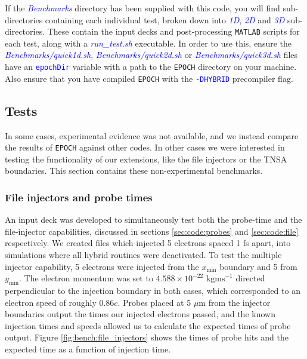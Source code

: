 \documentclass[12pt]{article}
\numberwithin{equation}{section}
\begin{document}
If the \textcolor{blue}{\textit{Benchmarks}} directory has been supplied with this code, you will find sub-directories containing each individual test, broken down into \textcolor{blue}{\textit{1D}}, \textcolor{blue}{\textit{2D}} and \textcolor{blue}{\textit{3D}} sub-directories. These contain the input decks and post-processing \texttt{MATLAB} scripts for each test, along with a \textcolor{blue}{\textit{run\_test.sh}} executable. In order to use this, ensure the \textcolor{blue}{\textit{Benchmarks/quick1d.sh}}, \textcolor{blue}{\textit{Benchmarks/quick2d.sh}} or \textcolor{blue}{\textit{Benchmarks/quick3d.sh}} files have an \textcolor{blue}{\texttt{epochDir}} variable with a path to the \texttt{EPOCH} directory on your machine. Also ensure that you have compiled \texttt{EPOCH} with the \textcolor{blue}{\texttt{-DHYBRID}} precompiler flag.   

\subsection{Tests} \label{sec:bench:tests}

In some cases, experimental evidence was not available, and we instead compare the results of \texttt{EPOCH} against other codes. In other cases we were interested in testing the functionality of our extensions, like the file injectors or the TNSA boundaries. This section contains these non-experimental benchmarks.

\subsubsection{File injectors and probe times} \label{sec:bench:File_injectors}

An input deck was developed to simultaneously test both the probe-time and the file-injector capabilities, discussed in sections \ref{sec:code:probes} and \ref{sec:code:file} respectively. We created files which injected 5 electrons spaced 1 fs apart, into simulations where all hybrid routines were deactivated. To test the multiple injector capability, 5 electrons were injected from the $x_\text{min}$ boundary and 5 from $y_\text{min}$. The electron momentum was set to $4.588\times 10^{-22} \text{ kgms}^{-1}$ directed perpendicular to the injection boundary in both cases, which corresponded to an electron speed of roughly 0.86$c$. Probes placed at 5 $\mu$m from the injector boundaries output the times our injected electrons passed, and the known injection times and speeds allowed us to calculate the expected times of probe output. Figure \ref{fig:bench:file_injectors} shows the times of probe hits and the expected time as a function of injection time.
\end{document}
